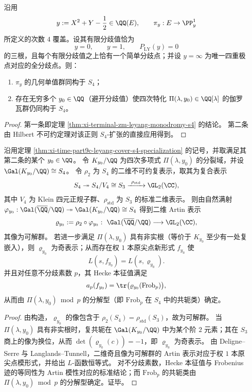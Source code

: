 \begin{theorem}\label{thm:xi-time-part9c-leyang-cover-s4-specialization}
沿用
\[
y:=X^2+Y-\frac12\in\QQ(E),\qquad \pi_y:E\to\PP^1_y
\]
所定义的次数 \(4\) 覆盖。设其有限分歧值恰为
\[
y=0,\qquad y=1,\qquad P_{\mathrm{LY}}(y)=0
\]
的三根，且每个有限分歧值之上恰有一个简单分歧点；并设 \(y=\infty\) 为唯一四重极点对应的全分歧点。则：
\begin{enumerate}
  \item \(\pi_y\) 的几何单值群同构于 \(S_4\)；
  \item 存在无穷多个 \(y_0\in\QQ\)（避开分歧值）使四次特化 \(\Pi(\lambda,y_0)\in\QQ[\lambda]\) 的伽罗瓦群仍同构于 \(S_4\)。
\end{enumerate}
\end{theorem}
\begin{proof}
第一条即定理 \ref{thm:xi-terminal-zm-leyang-monodromy-s4} 的结论。
第二条由 Hilbert 不可约定理对该正则 \(S_4\)-扩张的直接应用得到。
\end{proof}

\begin{theorem}\label{thm:xi-time-part9c-leyang-s4-specialization-artin-weight1}
沿用定理 \ref{thm:xi-time-part9c-leyang-cover-s4-specialization} 的记号，并取满足其第二条的某个 \(y_0\in\QQ\)。
令 \(K_{y_0}/\QQ\) 为四次多项式 \(\Pi(\lambda,y_0)\) 的分裂域，并设 \(\Gal(K_{y_0}/\QQ)\cong S_4\)。
令 \(\rho_2\) 为 \(S_4\) 的二维不可约复表示，取其为复合表示
\[
S_4\twoheadrightarrow S_4/V_4\cong S_3\xrightarrow{\ \rho_{\mathrm{std}}\ }\GL_2(\CC),
\]
其中 \(V_4\) 为 Klein 四元正规子群、\(\rho_{\mathrm{std}}\) 为 \(S_3\) 的标准二维表示。
则由自然满射 \(\varphi_{y_0}:\Gal(\overline{\QQ}/\QQ)\twoheadrightarrow \Gal(K_{y_0}/\QQ)\cong S_4\) 得到二维 Artin 表示
\[
\varrho_{y_0}:=\rho_2\circ \varphi_{y_0}:\ \Gal(\overline{\QQ}/\QQ)\longrightarrow \GL_2(\CC),
\]
其像为可解群。
若进一步满足 \(\Pi(\lambda,y_0)\) 具有非实根（等价于 \(K_{y_0}\) 至少有一处复嵌入），则 \(\varrho_{y_0}\) 为奇表示；从而存在权 \(1\) 本原尖点新形式 \(f_{y_0}\) 使
\[
L(s,f_{y_0})=L(s,\varrho_{y_0}).
\]
并且对任意不分歧素数 \(p\)，其 Hecke 本征值满足
\[
a_p(f_{y_0})=\tr\bigl(\varrho_{y_0}(\mathrm{Frob}_p)\bigr),
\]
从而由 \(\Pi(\lambda,y_0)\bmod p\) 的分解型（即 \(\mathrm{Frob}_p\) 在 \(S_4\) 中的共轭类）确定。
\end{theorem}
\begin{proof}
由构造，\(\varrho_{y_0}\) 的像包含于 \(\rho_2(S_4)=\rho_{\mathrm{std}}(S_3)\)，故为可解群。
当 \(\Pi(\lambda,y_0)\) 具有非实根时，复共轭在 \(\Gal(K_{y_0}/\QQ)\) 中为某个阶 \(2\) 元素；其在 \(S_3\) 商上的像为换位，从而 \(\det(\varrho_{y_0}(c))=-1\)，即 \(\varrho_{y_0}\) 为奇表示。
由 Deligne--Serre 与 Langlands--Tunnell，二维奇且像为可解群的 Artin 表示对应于权 \(1\) 本原尖点模形式，并给出 \(L\)-函数恒等式。
对不分歧素数，Hecke 本征值与 Frobenius 迹的等同性为 Artin 模性对应的标准结论；而 \(\mathrm{Frob}_p\) 的共轭类由 \(\Pi(\lambda,y_0)\bmod p\) 的分解型确定。证毕。
\end{proof}

